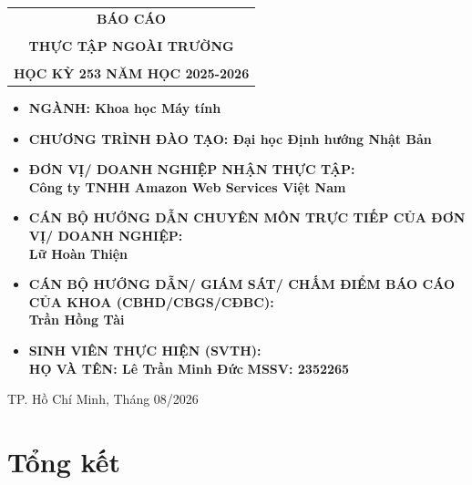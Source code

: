 \documentclass[a4paper]{article}
\theoremstyle{definition}
\begin{document}
\begin{titlepage}
\begin{center}
\begin{tabular}{c}
\multicolumn{1}{c}{\textbf{{\LARGE BÁO CÁO}}}\\
\\{\textbf{{\LARGE THỰC TẬP NGOÀI TRƯỜNG}}}
\\
\\
\textbf{\Large HỌC KỲ 253 NĂM HỌC 2025-2026} \\
\end{tabular}
\end{center}
\vspace{0.5cm}
\begin{itemize}
    \item[] \Large \textbf{NGÀNH: Khoa học Máy tính}
    \item[] \Large \textbf{CHƯƠNG TRÌNH ĐÀO TẠO: Đại học Định hướng Nhật Bản}
\end{itemize}
\vspace{0.7cm}
\begin{itemize}
    \item[] \Large \textbf{ĐƠN VỊ/ DOANH NGHIỆP NHẬN THỰC TẬP:}
    \\ \Large \textbf{Công ty TNHH Amazon Web Services Việt Nam}
    \item[] \Large \textbf{CÁN BỘ HƯỚNG DẪN CHUYÊN MÔN TRỰC TIẾP CỦA ĐƠN VỊ/ DOANH NGHIỆP:}
    \\ \Large \textbf{Lữ Hoàn Thiện}
    \item[] \Large \textbf{CÁN BỘ HƯỚNG DẪN/ GIÁM SÁT/ CHẤM ĐIỂM BÁO CÁO CỦA KHOA (CBHD/CBGS/CĐBC):}
    \\ \Large \textbf{Trần Hồng Tài}
    \item[] \Large \textbf{SINH VIÊN THỰC HIỆN (SVTH):}
    \\ \Large \textbf{HỌ VÀ TÊN: Lê Trần Minh Đức} \textbf{MSSV: 2352265}
\end{itemize}
\vspace{0.5cm}
\begin{center}
{\Large TP. Hồ Chí Minh, Tháng 08/2026}
\end{center}
\end{titlepage}

\newpage
\tableofcontents
\newpage





\newpage
\section{Tổng kết}
\end{document}
